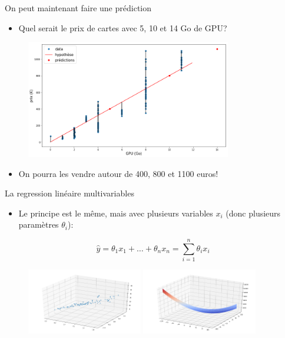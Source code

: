 \documentclass[11pt]{beamer}
\begin{document}
\begin{frame}{On peut maintenant faire une prédiction}
  \begin{itemize}
  \item Quel serait le prix de cartes avec 5, 10 et 14 Go de GPU? 
  \end{itemize}
  \vspace{-0.2cm}
  \begin{figure}
    \includegraphics[width=0.8\textwidth]{figs/pred.png}
  \end{figure}
  \vspace{-0.5cm}
  \begin{itemize}
  \item On pourra les vendre autour de 400, 800 et 1100 euros!
  \end{itemize} 
\end{frame}

\begin{frame}{La regression linéaire multivariables}
  \begin{itemize}
    \item Le principe est le même, mais avec plusieurs variables $x_{i}$ (donc plusieurs paramètres $\theta_{i}$):
  \end{itemize}
    \begin{equation*}
      \hat{y} = \theta_{1}x_{1} + \dots + \theta_{n}x_{n} = \displaystyle\sum_{i=1}^{n} \theta_{i} x_{i}
    \end{equation*}
  \begin{figure}
    \includegraphics[width=0.45\textwidth]{figs/multiVarData.png}
    \includegraphics[width=0.45\textwidth]{figs/multiVarCostFct.png}\\
  \end{figure}
\end{frame}
\end{document}

